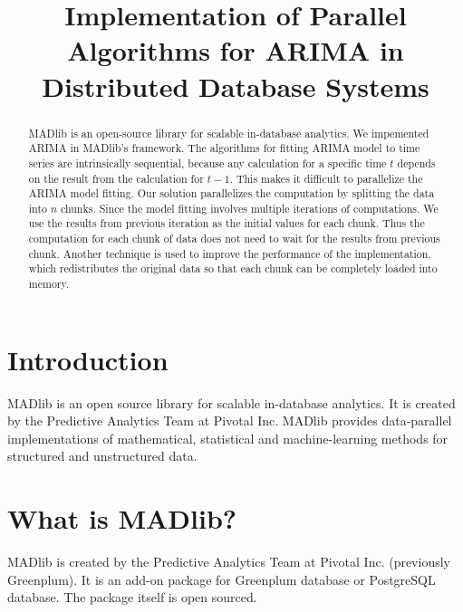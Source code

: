 \documentclass[english,12pt]{article}
\theoremstyle{algorithm}
\begin{document}
\title{Implementation of Parallel Algorithms for ARIMA in Distributed
  Database Systems}


\maketitle

\begin{abstract}
    MADlib is an open-source library for scalable in-database analytics. We
    impemented ARIMA in MADlib's framework. The algorithms for fitting ARIMA
    model to time series are intrinsically sequential, because any calculation
    for a specific time $t$ depends on the result from the calculation for
    $t-1$.  This makes it difficult to parallelize the ARIMA model fitting. Our
    solution parallelizes the computation by splitting the data into $n$
    chunks. Since the model fitting involves multiple iterations of
    computations. We use the results from previous iteration as the initial
    values for each chunk. Thus the computation for each chunk of data does not
    need to wait for the results from previous chunk. Another technique is used
    to improve the performance of the implementation, which redistributes the
    original data so that each chunk can be completely loaded into memory.
\end{abstract}

\section{Introduction}

MADlib \cite{madlib} is an open source library for scalable in-database
analytics.  It is created by the Predictive Analytics Team at Pivotal Inc.
MADlib provides data-parallel implementations of mathematical, statistical and
machine-learning methods for structured and unstructured data.

\section{What is MADlib?}


MADlib is created by the Predictive Analytics Team at Pivotal Inc. (previously
Greenplum). It is an add-on package for Greenplum database or PostgreSQL
database. The package itself is open sourced.
\end{document}
